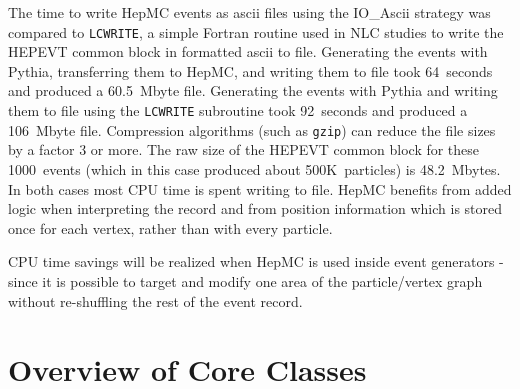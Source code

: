 \documentclass[11pt,letterpaper]{article}
\begin{document}
The time to write HepMC events as ascii files using the IO\_Ascii
strategy was compared to \verb!LCWRITE!, a simple Fortran routine used
in NLC studies to write the HEPEVT common block in formatted ascii to file.
Generating the events with Pythia, transferring them to HepMC, and
writing them to file took 64~seconds and produced a 60.5~Mbyte file.
Generating the events with Pythia and writing them to file using the
\verb!LCWRITE! subroutine took 92~seconds and produced a 106~Mbyte
file. Compression algorithms (such as \verb!gzip!) can reduce the file
sizes by a factor 3 or more.  The raw size of the HEPEVT common block
for these 1000~events (which in this case produced about 500K~particles) is
48.2~Mbytes.  In both cases most CPU time is spent writing to file.
HepMC benefits from added logic when interpreting the record and from 
position information which is stored once for each vertex, rather than
with every particle.  

CPU time savings will be realized when HepMC is
used inside event generators - since it is possible to target and
modify one area of the particle/vertex graph without re-shuffling the
rest of the event record.

%
%
\section{Overview of Core Classes}
%
%
\end{document}
